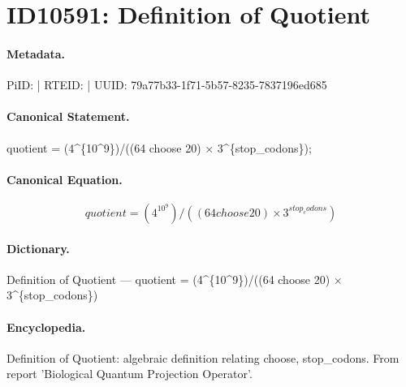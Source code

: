\section*{ID10591: Definition of Quotient}
\paragraph{Metadata.}
PiID:  | RTEID:  | UUID: 79a77b33-1f71-5b57-8235-7837196ed685

\paragraph{Canonical Statement.}
quotient = (4\textasciicircum{}\{10\textasciicircum{}9\})/((64 choose 20) × 3\textasciicircum{}\{stop\_codons\});

\paragraph{Canonical Equation.}
\[
quotient = (4^{10^9})/((64 choose 20) × 3^{stop_codons})
\]

\paragraph{Dictionary.}
Definition of Quotient — quotient = (4\textasciicircum{}\{10\textasciicircum{}9\})/((64 choose 20) × 3\textasciicircum{}\{stop\_codons\})

\paragraph{Encyclopedia.}
Definition of Quotient: algebraic definition relating choose, stop\_codons. From report 'Biological Quantum Projection Operator'.
